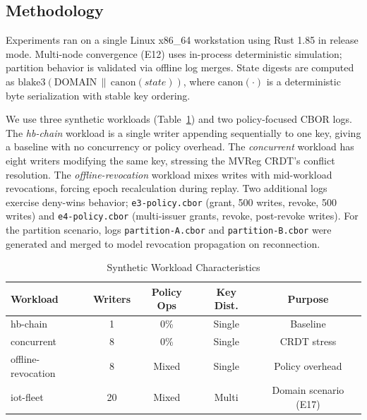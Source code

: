 \documentclass[10pt,journal,compsoc]{IEEEtran}
\begin{document}
\subsection{Methodology}\label{subsec:methodology}

Experiments ran on a single Linux x86\_64 workstation using Rust 1.85 in release mode. Multi-node convergence (E12) uses in-process deterministic simulation; partition behavior is validated via offline log merges. State digests are computed as $\mathrm{blake3}(\mathrm{DOMAIN}\,\|\,\mathrm{canon}(\textit{state}))$, where $\mathrm{canon}(\cdot)$ is a deterministic byte serialization with stable key ordering.

We use three synthetic workloads (Table~\ref{tab:workloads}) and two policy-focused CBOR logs. The \emph{hb-chain} workload is a single writer appending sequentially to one key, giving a baseline with no concurrency or policy overhead. The \emph{concurrent} workload has eight writers modifying the same key, stressing the MVReg CRDT's conflict resolution. The \emph{offline-revocation} workload mixes writes with mid-workload revocations, forcing epoch recalculation during replay. Two additional logs exercise deny-wins behavior; \texttt{e3-policy.cbor} (grant, 500 writes, revoke, 500 writes) and \texttt{e4-policy.cbor} (multi-issuer grants, revoke, post-revoke writes). For the partition scenario, logs \texttt{partition-A.cbor} and \texttt{partition-B.cbor} were generated and merged to model revocation propagation on reconnection.

\begin{table}[!htbp]
\centering
\caption{Synthetic Workload Characteristics}
\label{tab:workloads}

\footnotesize
\setlength{\tabcolsep}{4pt}
\renewcommand{\arraystretch}{1.1}

\begin{tabular}{@{}lcccc@{}}
\toprule
\textbf{Workload} & \textbf{Writers} & \textbf{Policy Ops} & \textbf{Key Dist.} & \textbf{Purpose} \\
\midrule
hb-chain                    & 1 & 0\%   & Single & Baseline \\
concurrent                  & 8 & 0\%   & Single & CRDT stress \\
offline-\allowbreak revocation & 8 & Mixed & Single & Policy overhead \\
iot-\allowbreak fleet         & 20 & Mixed & Multi  & Domain scenario (E17) \\
\bottomrule
\end{tabular}
\end{table}
\end{document}
